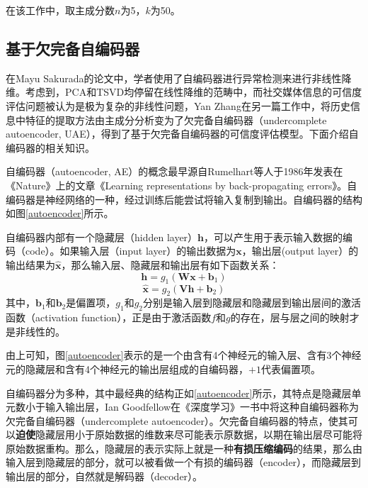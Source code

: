 \documentclass[a4paper,oneside,12pt]{book}
\begin{document}
在该工作中，取主成分数$n$为5，$k$为50。

\subsection{基于欠完备自编码器}
在Mayu  Sakurada的论文\cite{Sakurada2014Anomaly}中，学者使用了自编码器进行异常检测来进行非线性降维。考虑到，PCA和TSVD均停留在线性降维的范畴中，而社交媒体信息的可信度评估问题被认为是极为复杂的非线性问题，Yan Zhang在另一篇工作\cite{Yan2017Autoencoder}中，将历史信息中特征的提取方法由主成分分析变为了欠完备自编码器（undercomplete autoencoder, UAE），得到了基于欠完备自编码器的可信度评估模型。下面介绍自编码器的相关知识。

自编码器（autoencoder, AE）的概念最早源自Rumelhart等人于1986年发表在《Nature》上的文章《Learning representations by back-propagating errors》\cite{Rumerlhar1986Learning}。自编码器是神经网络的一种，经过训练后能尝试将输入复制到输出。\cite{Goodfellow2016DeepLearning}自编码器的结构如图\ref{autoencoder}所示。


自编码器内部有一个隐藏层（hidden layer）$\bm{h}$，可以产生用于表示输入数据的编码（code）。如果输入层（input layer）的输出数据为$\bm{x}$，输出层(output layer）的输出结果为$\hat{\bm{x}}$，那么输入层、隐藏层和输出层有如下函数关系：
\begin{equation}
\bm{h}=g_1(\bm{W}\bm{x}+\bm{b}_1)
\end{equation}
\begin{equation}
\hat{\bm{x}}=g_2(\bm{V}\bm{h}+\bm{b}_2)
\end{equation}
其中，$\bm{b}_1$和$\bm{b}_2$是偏置项，$g_1$和$g_2$分别是输入层到隐藏层和隐藏层到输出层间的激活函数（activation function），正是由于激活函数$f$和$g$的存在，层与层之间的映射才是非线性的。

由上可知，图\ref{autoencoder}表示的是一个由含有4个神经元的输入层、含有3个神经元的隐藏层和含有4个神经元的输出层组成的自编码器，$+1$代表偏置项。

自编码器分为多种，其中最经典的结构正如\ref{autoencoder}所示，其特点是隐藏层单元数小于输入输出层，Ian Goodfellow在《深度学习》\cite{Goodfellow2016DeepLearning}一书中将这种自编码器称为欠完备自编码器（undercomplete autoencoder）。欠完备自编码器的特点，使其可以\textbf{迫使}隐藏层用小于原始数据的维数来尽可能表示原数据，以期在输出层尽可能将原始数据重构。那么，隐藏层的表示实际上就是一种\textbf{有损压缩编码}的结果，那么由输入层到隐藏层的部分，就可以被看做一个有损的编码器（encoder），而隐藏层到输出层的部分，自然就是解码器（decoder）。
\end{document}

